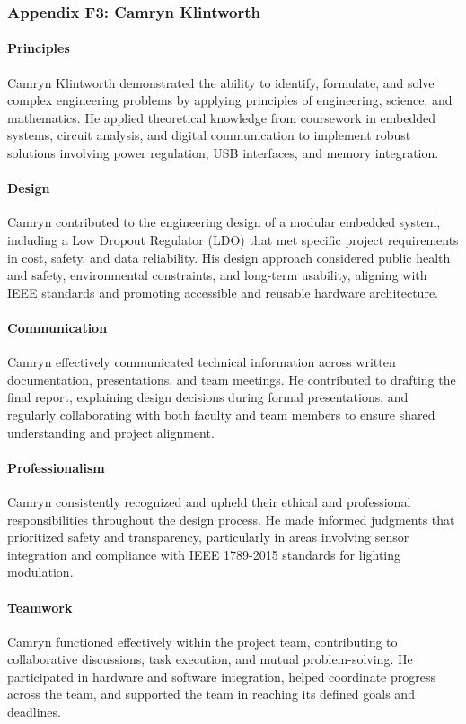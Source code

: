 \documentclass[../../main.tex]{subfiles}
\begin{document}
\subsubsection{Appendix F3: Camryn Klintworth}

\paragraph{Principles}
Camryn Klintworth demonstrated the ability to identify, formulate, and solve complex engineering problems by applying principles of engineering, science, and mathematics. He applied theoretical knowledge from coursework in embedded systems, circuit analysis, and digital communication to implement robust solutions involving power regulation, USB interfaces, and memory integration.

\paragraph{Design}
Camryn contributed to the engineering design of a modular embedded system, including a Low Dropout Regulator (LDO) that met specific project requirements in cost, safety, and data reliability. His design approach considered public health and safety, environmental constraints, and long-term usability, aligning with IEEE standards and promoting accessible and reusable hardware architecture.

\paragraph{Communication}
Camryn effectively communicated technical information across written documentation, presentations, and team meetings. He contributed to drafting the final report, explaining design decisions during formal presentations, and regularly collaborating with both faculty and team members to ensure shared understanding and project alignment.

\paragraph{Professionalism}
Camryn consistently recognized and upheld their ethical and professional responsibilities throughout the design process. He made informed judgments that prioritized safety and transparency, particularly in areas involving sensor integration and compliance with IEEE 1789-2015 standards for lighting modulation.

\paragraph{Teamwork}
Camryn functioned effectively within the project team, contributing to collaborative discussions, task execution, and mutual problem-solving. He participated in hardware and software integration, helped coordinate progress across the team, and supported the team in reaching its defined goals and deadlines.
\end{document}
